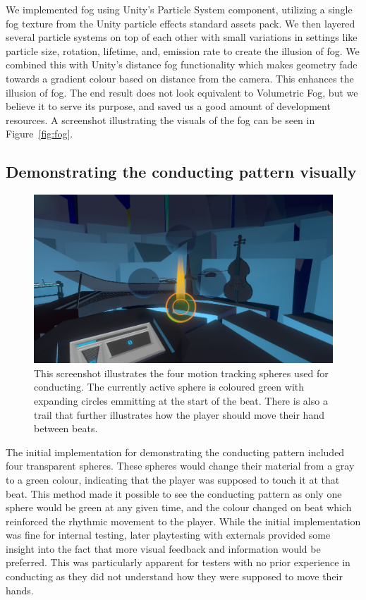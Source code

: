 We implemented fog using Unity's Particle System component, utilizing a single fog texture from the Unity particle effects standard assets pack. We then layered several particle systems on top of each other with small variations in settings like particle size, rotation, lifetime, and, emission rate to create the illusion of fog. We combined this with Unity’s distance fog functionality which makes geometry fade towards a gradient colour based on distance from the camera. This enhances the illusion of fog. The end result does not look equivalent to Volumetric Fog, but we believe it to serve its purpose, and saved us a good amount of development resources. A screenshot illustrating the visuals of the fog can be seen in Figure~\ref{fig:fog}. 


\subsection{Demonstrating the conducting pattern visually}
\begin{figure}[tbph]
    \centering
    \includegraphics[width=1.0\textwidth]{images/spheres-trail-pulse}
    \caption[Screenshot of Motion Tracking Spheres]{This screenshot illustrates the four motion tracking spheres used for conducting. The currently active sphere is coloured green with expanding circles emmitting at the start of the beat. There is also a trail that further illustrates how the player should move their hand between beats.}
    \label{fig:trackingspheres}
\end{figure}
The initial implementation for demonstrating the conducting pattern included four transparent spheres. These spheres would change their material from a gray to a green colour, indicating that the player was supposed to touch it at that beat. This method made it possible to see the conducting pattern as only one sphere would be green at any given time, and the colour changed on beat which reinforced the rhythmic movement to the player. While the initial implementation was fine for internal testing, later playtesting with externals provided some insight into the fact that more visual feedback and information would be preferred. This was particularly apparent for testers with no prior experience in conducting as they did not understand how they were supposed to move their hands. 

